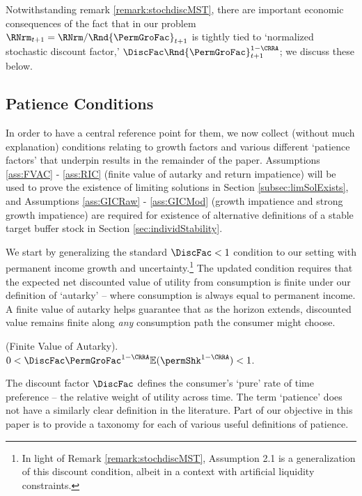 \documentclass[BufferStockTheory]{subfiles}
\begin{document}
Notwithstanding remark \ref{remark:stochdiscMST},  there are important economic consequences of the fact that in our problem $\RNrm_{t+1}=\RNrm/\Rnd{\PermGroFac}_{t+1}$ is tightly tied to `normalized stochastic discount factor,' $\DiscFac \Rnd{\PermGroFac}_{t+1}^{1-\CRRA}$; we discuss these below.

\hypertarget{GICTheorySetup}{}
\subsection{Patience Conditions}\label{subsec:GICTheorySetup}

In order to have a central reference point for them, we now collect (without much explanation) conditions relating to growth factors and various different `patience factors' that underpin results in the remainder of the paper. Assumptions \ref{ass:FVAC} - \ref{ass:RIC}  (finite value of autarky and return impatience) will be used to prove the existence of limiting solutions in Section \ref{subsec:limSolExists}, and Assumptions \ref{ass:GICRaw} - \ref{ass:GICMod} (growth impatience and strong growth impatience) are required for existence of alternative definitions of a stable target buffer stock in Section \ref{sec:individStability}. 

We start by generalizing the standard $\DiscFac<1$ condition to our setting with permanent income growth and uncertainty.\footnote{In light of Remark \ref{remark:stochdiscMST}, \cite{mstIncFluct} Assumption 2.1 is a generalization of this discount condition, albeit in a context with artificial liquidity constraints.} The updated condition requires that the expected net discounted value of utility from consumption is finite under our definition of `autarky' -- where consumption is always equal to permanent income. A finite value of autarky helps guarantee that as the horizon extends, discounted value remains finite along \textit{any} consumption path the consumer might choose.  


\hypertarget{FVAC}{}
\begin{assumL}\label{ass:FVAC}(Finite Value of Autarky). 
%
$0 < \DiscFac \PermGroFac^{1-\CRRA}\mathbb{E}(\permShk^{1-\CRRA}) < 1 $.
%
\end{assumL}

The discount factor $\DiscFac$ defines the consumer's `pure' rate of time preference -- the relative weight of utility across time.  The term `patience' does not have a similarly clear definition in the literature. Part of our objective in this paper is to provide a taxonomy for each of various useful definitions of patience.
\end{document}
